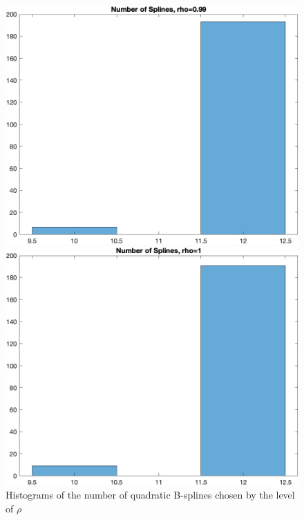 \documentclass[
]{article}
\begin{document}
\begin{figure}
\begin{minipage}{0.50\linewidth}
\includegraphics{../figures/hist_n_spli_rho-0.99_finer_grid.png}\end{minipage}%
%
\begin{minipage}{0.50\linewidth}
\includegraphics{../figures/hist_n_spli_rho-1_finer_grid.png}\end{minipage}%

\caption{\label{fig-hist-n-splies-finer-9}Histograms of the number of
quadratic B-splines chosen by the level of \(\rho\)}

\end{figure}%
\end{document}
